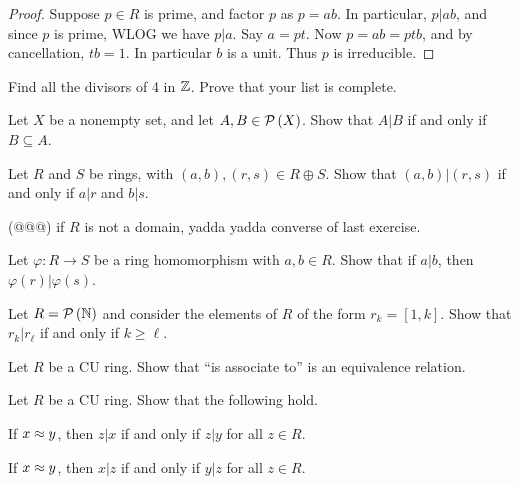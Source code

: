 \begin{proof}
Suppose \(p \in R\) is prime, and factor \(p\) as \(p = ab\).
In particular, \(p|ab\), and since \(p\) is prime, WLOG we have \(p|a\).
Say \(a = pt\).
Now \(p = ab = ptb\), and by cancellation, \(tb = 1\).
In particular \(b\) is a unit.
Thus \(p\) is irreducible.
\end{proof}



\Exercises%

\begin{exercise}
Find all the divisors of 4 in \(\mathbb{Z}\).
Prove that your list is complete.
\end{exercise}

\begin{exercise}
Let \(X\) be a nonempty set, and let \(A,B \in \mathcal{P}\left(X\right)\).
Show that \(A|B\) if and only if \(B \subseteq A\).
\end{exercise}

\begin{exercise}
Let \(R\) and \(S\) be rings, with \((a,b), (r,s) \in R \oplus S\).
Show that \((a,b) | (r,s)\) if and only if \(a|r\) and \(b|s\).
\end{exercise}

\begin{exercise}
(@@@) if \(R\) is not a domain, yadda yadda converse of last exercise.
\end{exercise}

\begin{exercise}
Let \(\varphi : R \rightarrow S\) be a ring homomorphism with \(a,b \in R\).
Show that if \(a|b\), then \(\varphi(r)|\varphi(s)\).
\end{exercise}

\begin{exercise}
Let \(R = \mathcal{P}\left(\mathbb{N}\right)\) and consider the elements of \(R\) of the form \(r_k = [1,k]\).
Show that \(r_k|r_\ell\) if and only if \(k \geq \ell\).
\end{exercise}

\begin{exercise} \label{exerc:assoc-equiv}
Let \(R\) be a CU ring.
Show that ``is associate to'' is an equivalence relation.
\end{exercise}

\begin{exercise} \label{exerc:associate-divides}
Let \(R\) be a CU ring.
Show that the following hold.
\begin{proplist*}
\item \label{exerc:associate-divides:divide-R} If \(x \approx y\), then \(z|x\) if and only if \(z|y\) for all \(z \in R\).
\item \label{exerc:associate-divides:divide-L} If \(x \approx y\), then \(x|z\) if and only if \(y|z\) for all \(z \in R\).
\end{proplist*}
\end{exercise}

